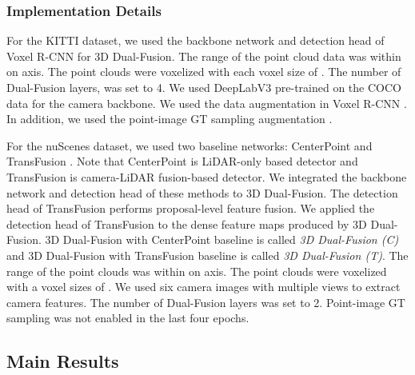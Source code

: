 \documentclass[lettersize,journal]{IEEEtran}
\begin{document}
\subsubsection{Implementation Details}
For the KITTI dataset, we used the backbone network and detection head of  Voxel R-CNN \cite{voxelrcnn} for 3D Dual-Fusion. The range of the point cloud data was within  on   axis. The point clouds were voxelized with each voxel size of . The number of Dual-Fusion layers,  was set to 4. We used DeepLabV3 \cite{deeplabv3} pre-trained on the COCO data for the camera backbone.
We used the data augmentation in Voxel R-CNN \cite{voxelrcnn}. In addition, we used  the point-image GT sampling augmentation \cite{moca}. 

For the nuScenes dataset, we used two baseline networks: CenterPoint \cite{centerpoint} and  TransFusion \cite{transfusion}. Note that CenterPoint is LiDAR-only based detector and TransFusion is camera-LiDAR fusion-based detector.  We integrated the backbone network and detection head of these methods to 3D Dual-Fusion. The detection head of TransFusion performs proposal-level feature fusion. We applied the detection head of TransFusion to the dense feature maps produced by 3D Dual-Fusion.  3D Dual-Fusion with CenterPoint baseline is called {\it 3D Dual-Fusion (C)} and 3D Dual-Fusion with TransFusion baseline is called {\it 3D Dual-Fusion (T)}. The range of the point clouds was within  on   axis. The point clouds were voxelized with a voxel sizes of . We used six camera images with multiple views to extract camera features. The number of Dual-Fusion layers  was set to 2. Point-image GT sampling was not enabled in the last four epochs. 



\subsection{Main Results}
\end{document}
